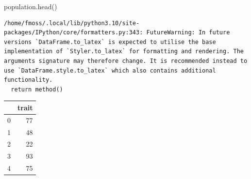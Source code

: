 \documentclass[
  a4paperpaper,
  ,captions=tableheading
]{scrbook}
\newenvironment{Shaded}{\begin{snugshade}}{\end{snugshade}}
\newcommand{\NormalTok}[1]{\textcolor[rgb]{0.00,0.23,0.31}{#1}}
\begin{document}
\begin{Shaded}
\begin{Highlighting}[]
\NormalTok{population.head()}
\end{Highlighting}
\end{Shaded}

\begin{verbatim}
/home/fmoss/.local/lib/python3.10/site-packages/IPython/core/formatters.py:343: FutureWarning: In future versions `DataFrame.to_latex` is expected to utilise the base implementation of `Styler.to_latex` for formatting and rendering. The arguments signature may therefore change. It is recommended instead to use `DataFrame.style.to_latex` which also contains additional functionality.
  return method()
\end{verbatim}

\begin{tabular}{lr}
\toprule
{} &  trait \\
\midrule
0 &     77 \\
1 &     48 \\
2 &     22 \\
3 &     93 \\
4 &     75 \\
\bottomrule
\end{tabular}
\end{document}
